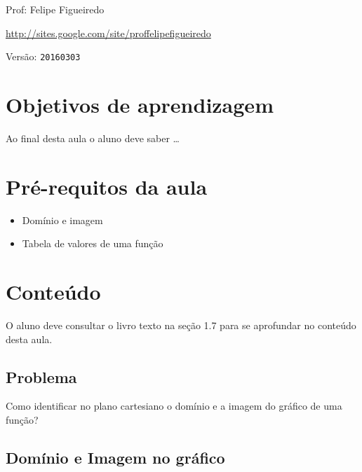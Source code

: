 \documentclass[a4paper]{article}
\begin{document}
\parbox[c]{.825\textwidth}{\raggedright%
{Prof: Felipe Figueiredo\par}
{\url{http://sites.google.com/site/proffelipefigueiredo}\par}
}

Versão: \verb|20160303|



\section{Objetivos de aprendizagem}

Ao final desta aula o aluno deve saber \ldots


\section{Pré-requitos da aula}

\begin{itemize}
\item Domínio e imagem
\item Tabela de valores de uma função
\end{itemize}

\section{Conteúdo}

O aluno deve consultar o livro texto na seção 1.7 para se aprofundar
no conteúdo desta aula.

\subsection{Problema}

Como identificar no plano cartesiano o domínio e a imagem do gráfico de uma função?

\subsection{Domínio e Imagem no gráfico}
\end{document}
